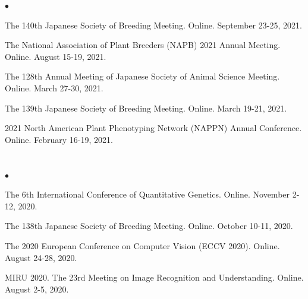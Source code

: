 \documentclass[margin,line,10pt]{res}
\newenvironment{list2}{
  \begin{list}{$\bullet$}{%
      \setlength{\itemsep}{0in}
      \setlength{\parsep}{0in} \setlength{\parskip}{0in}
      \setlength{\topsep}{0in} \setlength{\partopsep}{0in} 
      \setlength{\leftmargin}{0.2in}}}{\end{list}}
\begin{document}
\begin{resume}
\begin{list2}
 
  
\item The 140th Japanese Society of Breeding Meeting. Online. September 23-25, 2021. 

   \vspace{0.5cm}

   \item  The National Association of Plant Breeders (NAPB) 2021 Annual Meeting. Online. August 15-19, 2021. 
  
     \vspace{0.5cm}

\item  The 128th Annual Meeting of Japanese Society of Animal Science Meeting. Online. March 27-30, 2021. 
  
  \vspace{0.5cm}
  
\item The 139th Japanese Society of Breeding Meeting. Online. March 19-21, 2021.

    \vspace{0.5cm}

  \item 2021 North American Plant Phenotyping Network (NAPPN) Annual Conference. Online. February 16-19, 2021.  
  
\end{list2}

  
\section{}
\begin{list2}


\item  The 6th International Conference of Quantitative Genetics. Online. November 2-12, 2020. 

  \vspace{0.5cm}

  
  \item The 138th Japanese Society of Breeding Meeting. Online. October 10-11, 2020. 

    \vspace{0.5cm}
    
\item The 2020 European Conference on Computer Vision (ECCV 2020). Online. August 24-28, 2020.  

      \vspace{0.5cm}

\item MIRU 2020. The 23rd Meeting on Image Recognition and Understanding. Online. August 2-5, 2020. 


\end{list2}
\end{resume}
\end{document}

